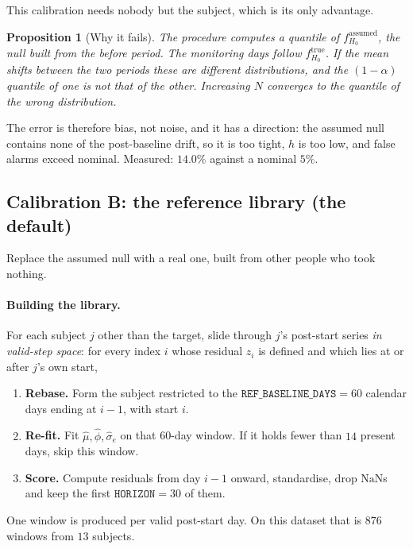\documentclass{article}
\theoremstyle{plain}
\newtheorem{proposition}[theorem]{Proposition}
\theoremstyle{definition}
\theoremstyle{remark}
\numberwithin{equation}{section}
\begin{document}
This calibration needs nobody but the subject, which is its only advantage.

\begin{proposition}[Why it fails]
\label{prop:fails}
The procedure computes a quantile of $f^{\mathrm{assumed}}_{H_0}$, the null
built from the before period. The monitoring days follow
$f^{\mathrm{true}}_{H_0}$. If the mean shifts between the two periods these are
different distributions, and the $(1-\alpha)$ quantile of one is not that of
the other. Increasing $N$ converges to the quantile of the wrong distribution.
\end{proposition}

The error is therefore bias, not noise, and it has a direction: the assumed
null contains none of the post-baseline drift, so it is too tight, $h$ is too
low, and false alarms exceed nominal. Measured: $14.0\%$ against a nominal
$5\%$.

\subsection{Calibration B: the reference library (the default)}
\label{sec:reflib}

Replace the assumed null with a real one, built from other people who took
nothing.

\paragraph{Building the library.} For each subject $j$ other than the target,
slide through $j$'s post-start series \emph{in valid-step space}: for every
index $i$ whose residual $z_i$ is defined and which lies at or after $j$'s own
start,
\begin{enumerate}[nosep]
  \item \textbf{Rebase.} Form the subject restricted to the
    $\texttt{REF\_BASELINE\_DAYS} = 60$ calendar days ending at $i-1$, with
    start $i$.
  \item \textbf{Re-fit.} Fit $\hat\mu,\hat\phi,\hat\sigma_e$ on that
    60-day window. If it holds fewer than $14$ present days, skip this window.
  \item \textbf{Score.} Compute residuals from day $i-1$ onward, standardise,
    drop $\mathrm{NaN}$s and keep the first $\texttt{HORIZON}=30$ of them.
\end{enumerate}
One window is produced per valid post-start day. On this dataset that is $876$
windows from $13$ subjects.
\end{document}
